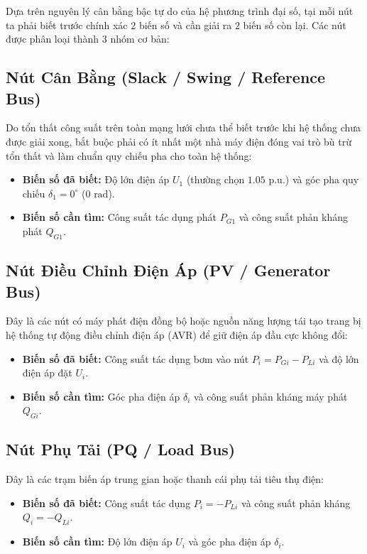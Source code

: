\documentclass[12pt,a4paper,oneside]{report}
\begin{document}
Dựa trên nguyên lý cân bằng bậc tự do của hệ phương trình đại số, tại mỗi nút ta phải biết trước chính xác 2 biến số và cần giải ra 2 biến số còn lại. Các nút được phân loại thành 3 nhóm cơ bản:

\subsection{Nút Cân Bằng (Slack / Swing / Reference Bus)}
Do tổn thất công suất trên toàn mạng lưới chưa thể biết trước khi hệ thống chưa được giải xong, bắt buộc phải có ít nhất một nhà máy điện đóng vai trò bù trừ tổn thất và làm chuẩn quy chiếu pha cho toàn hệ thống:
\begin{itemize}
    \item \textbf{Biến số đã biết:} Độ lớn điện áp $U_1$ (thường chọn $1.05\text{ p.u.}$) và góc pha quy chiếu $\delta_1 = 0^\circ$ ($0\text{ rad}$).
    \item \textbf{Biến số cần tìm:} Công suất tác dụng phát $P_{G1}$ và công suất phản kháng phát $Q_{G1}$.
\end{itemize}

\subsection{Nút Điều Chỉnh Điện Áp (PV / Generator Bus)}
Đây là các nút có máy phát điện đồng bộ hoặc nguồn năng lượng tái tạo trang bị hệ thống tự động điều chỉnh điện áp (AVR) để giữ điện áp đầu cực không đổi:
\begin{itemize}
    \item \textbf{Biến số đã biết:} Công suất tác dụng bơm vào nút $P_i = P_{Gi} - P_{Li}$ và độ lớn điện áp đặt $U_i$.
    \item \textbf{Biến số cần tìm:} Góc pha điện áp $\delta_i$ và công suất phản kháng máy phát $Q_{Gi}$.
\end{itemize}

\subsection{Nút Phụ Tải (PQ / Load Bus)}
Đây là các trạm biến áp trung gian hoặc thanh cái phụ tải tiêu thụ điện:
\begin{itemize}
    \item \textbf{Biến số đã biết:} Công suất tác dụng $P_i = -P_{Li}$ và công suất phản kháng $Q_i = -Q_{Li}$.
    \item \textbf{Biến số cần tìm:} Độ lớn điện áp $U_i$ và góc pha điện áp $\delta_i$.
\end{itemize}
\end{document}

